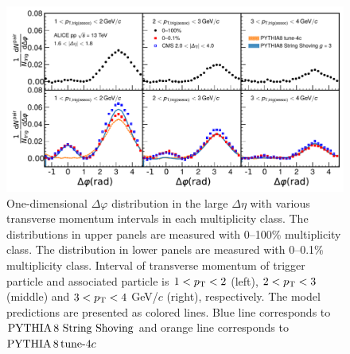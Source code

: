 \begin{figure}[h!]
	\centering
	\includegraphics[width=0.9\linewidth]{./figures/Fig2_PlotDeltaPhi.pdf}
	\caption{One-dimensional $\Delta\varphi$ distribution in the large $\Delta\eta$ with various transverse momentum intervals in each multiplicity class. The distributions in upper panels are measured with 0--100\% multiplicity class. The distribution in lower panels are measured with 0--0.1\% multiplicity class. Interval of transverse momentum of trigger particle and associated particle is $1<p_\mathrm{T}<2$ (left), $2<p_\mathrm{T}<3$ (middle) and $3<p_\mathrm{T}<4$ GeV/$c$ (right), respectively. The model predictions are presented as colored lines. Blue line corresponds to $\mathrm{PYTHIA}\,8~\mathrm{String}~\mathrm{Shoving}$ and orange line corresponds to $\mathrm{PYTHIA}\,8\,\mathrm{tune}{\text -}4c$}
	\label{fig:PlotDeltaPhi}
\end{figure}
 
